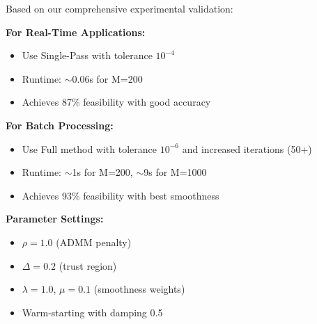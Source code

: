 Based on our comprehensive experimental validation:

\textbf{For Real-Time Applications:}
\begin{itemize}
\item Use Single-Pass with tolerance $10^{-4}$
\item Runtime: $\sim$0.06s for M=200
\item Achieves 87\% feasibility with good accuracy
\end{itemize}

\textbf{For Batch Processing:}
\begin{itemize}
\item Use Full method with tolerance $10^{-6}$ and increased iterations (50+)
\item Runtime: $\sim$1s for M=200, $\sim$9s for M=1000
\item Achieves 93\% feasibility with best smoothness
\end{itemize}

\textbf{Parameter Settings:}
\begin{itemize}
\item $\rho = 1.0$ (ADMM penalty)
\item $\Delta = 0.2$ (trust region)
\item $\lambda = 1.0$, $\mu = 0.1$ (smoothness weights)
\item Warm-starting with damping 0.5
\end{itemize}

